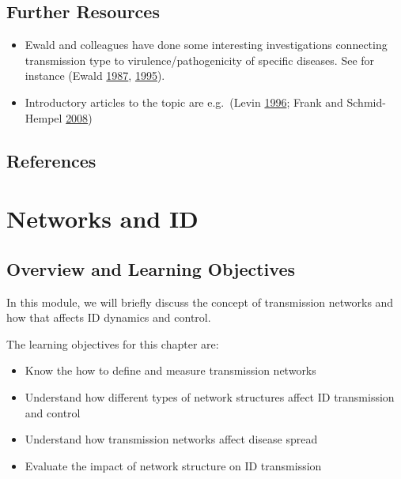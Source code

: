 \documentclass[
]{book}
\providecommand{\tightlist}{%
  \setlength{\itemsep}{0pt}\setlength{\parskip}{0pt}}
\begin{document}
\hypertarget{further-resources-16}{%
\section{Further Resources}\label{further-resources-16}}

\begin{itemize}
\tightlist
\item
  Ewald and colleagues have done some interesting investigations connecting transmission type to virulence/pathogenicity of specific diseases. See for instance (Ewald \protect\hyperlink{ref-ewald87}{1987}, \protect\hyperlink{ref-ewald95}{1995}).
\item
  Introductory articles to the topic are e.g.~(Levin \protect\hyperlink{ref-levin96}{1996}; Frank and Schmid-Hempel \protect\hyperlink{ref-frank08}{2008})
\end{itemize}

\hypertarget{references-17}{%
\section{References}\label{references-17}}

\hypertarget{networks-and-id}{%
\chapter{Networks and ID}\label{networks-and-id}}

\hypertarget{overview-and-learning-objectives-17}{%
\section{Overview and Learning Objectives}\label{overview-and-learning-objectives-17}}

In this module, we will briefly discuss the concept of transmission networks and how that affects ID dynamics and control.

The learning objectives for this chapter are:

\begin{itemize}
\tightlist
\item
  Know the how to define and measure transmission networks
\item
  Understand how different types of network structures affect ID transmission and control
\item
  Understand how transmission networks affect disease spread
\item
  Evaluate the impact of network structure on ID transmission
\end{itemize}
\end{document}
